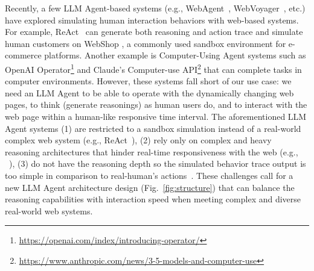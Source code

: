 \documentclass[manuscript,review,anonymous]{acmart}
\begin{document}
Recently, a few LLM Agent-based systems (e.g., WebAgent~\cite{gurRealWorldWebAgentPlanning2023}, WebVoyager~\cite{heWebVoyagerBuildingEndtoEnd2024}, etc.) have explored simulating human interaction behaviors with web-based systems.
For example, ReAct~\cite{yaoReActSynergizingReasoning2023} can generate both reasoning and action trace and simulate human customers on WebShop \cite{yaoWebShopScalableRealWorld2022}, a commonly used sandbox environment for e-commerce platforms.
Another example is Computer-Using Agent systems such as OpenAI Operator\footnote{\url{https://openai.com/index/introducing-operator/}} and Claude’s Computer-use API\footnote{\url{https://www.anthropic.com/news/3-5-models-and-computer-use}} that can complete tasks in computer environments.
However, these systems fall short of our use case: we need an LLM Agent to be able to operate with the dynamically changing web pages, to think (generate reasonings) as human users do, and to interact with the web page within a human-like responsive time interval.
The aforementioned LLM Agent systems (1) are restricted to a sandbox simulation instead of a real-world complex web system (e.g., ReAct~\cite{yaoReActSynergizingReasoning2023}), (2) rely only on complex and heavy reasoning architectures that hinder real-time responsiveness with the web (e.g., ~\cite{maLASERLLMAgent2024,heWebVoyagerBuildingEndtoEnd2024,gurRealWorldWebAgentPlanning2023}), (3) do not have the reasoning depth so the simulated behavior trace output is too simple in comparison to real-human's actions~\cite{sodhiStePStackedLLM2024}.
These challenges call for a new LLM Agent architecture design (Fig.~\ref{fig:structure}) that can balance the reasoning capabilities with interaction speed when meeting complex and diverse real-world web systems.
\end{document}
